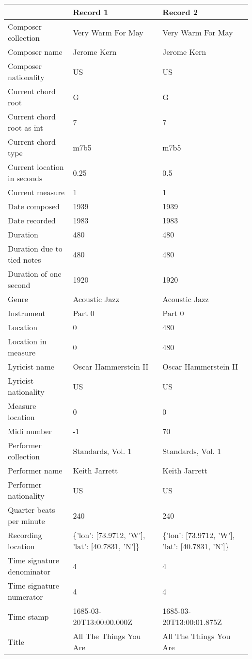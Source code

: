 \documentclass[11pt]{article}
\begin{document}
    \begin{tabular}{lll}
\toprule
{} &                                        Record 1 &                                        Record 2 \\
\midrule
Composer collection         &  Very Warm For May &  Very Warm For May \\
Composer name               &  Jerome Kern &  Jerome Kern \\
Composer nationality        &  US &  US \\
Current chord root          &  G &  G \\
Current chord root as int   &  7 &  7 \\
Current chord type          &  m7b5 &  m7b5 \\
Current location in seconds &  0.25 &  0.5 \\
Current measure             &  1 &  1 \\
Date composed               &  1939 &  1939 \\
Date recorded               &  1983 &  1983 \\
Duration                    &  480 &  480 \\
Duration due to tied notes  &  480 &  480 \\
Duration of one second      &  1920 &  1920 \\
Genre                       &  Acoustic Jazz &  Acoustic Jazz \\
Instrument                  &  Part 0 &  Part 0 \\
Location                    &  0 &  480 \\
Location in measure         &  0 &  480 \\
Lyricist name               &  Oscar Hammerstein II &  Oscar Hammerstein II \\
Lyricist nationality        &  US &  US \\
Measure location            &  0 &  0 \\
Midi number                 &  -1 &  70 \\
Performer collection        &  Standards, Vol. 1 &  Standards, Vol. 1 \\
Performer name              &  Keith Jarrett &  Keith Jarrett \\
Performer nationality       &  US &  US \\
Quarter beats per minute    &  240 &  240 \\
Recording location          &  \{'lon': [73.9712, 'W'], 'lat': [40.7831, 'N']\} &  \{'lon': [73.9712, 'W'], 'lat': [40.7831, 'N']\} \\
Time signature denominator  &  4 &  4 \\
Time signature numerator    &  4 &  4 \\
Time stamp                  &  1685-03-20T13:00:00.000Z &  1685-03-20T13:00:01.875Z \\
Title                       &  All The Things You Are &  All The Things You Are \\
\bottomrule
\end{tabular}
\end{document}
